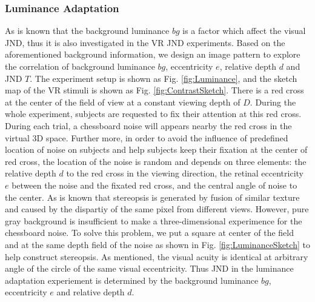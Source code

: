 \documentclass[journal]{IEEEtran}
\begin{document}
\subsubsection{Luminance Adaptation}
As is known that the background luminance $bg$ is a factor which affect the visual JND, thus it is also investigated in the VR JND experiments. Based on the aforementioned background information, we design an image pattern to explore the correlation of background luminance $bg$, eccentricity $e$, relative depth $d$ and JND $T$. The experiment setup is shown as Fig. \ref{fig:Luminance}, and the sketch map of the VR stimuli is shown as Fig. \ref{fig:ContrastSketch}. There is a red cross at the center of the field of view at a constant viewing depth of $D$. During the whole experiment, subjects are requested to fix their attention at this red cross. During each trial, a chessboard noise will appears nearby the red cross in the virtual 3D space. Further more, in order to avoid the influence of predefined location of noise on subjects and help subjects keep their fixation at the center of red cross, the location of the noise is random and depends on three elements: the relative depth $d$ to the red cross in the viewing direction, the retinal eccentricity $e$ between the noise and the fixated red cross, and the central angle of noise to the center. As is known that stereopsis is generated by fusion of similar texture and caused by the dispartiy of the same pixel from different views. However, pure gray background is insufficient to make a three-dimensional experimence for the chessboard noise. To solve this problem, we put a square at center of the field and at the same depth field of the noise as shown in Fig. \ref{fig:LuminanceSketch} to help construct stereopsis. As mentioned, the visual acuity is identical at arbitrary angle of the circle of the same visual eccentricity. Thus JND in the luminance adaptation experiement is determined by the background luminance $bg$, eccentricity $e$ and relative depth $d$. 
\end{document}

